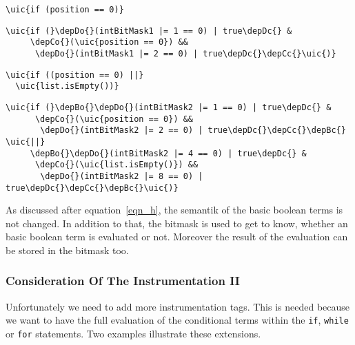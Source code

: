 \documentclass[a4paper,12pt,DIV12]{scrartcl}
\newcommand{\uic}[1]{\textcolor{UnInstrumentedColor}{#1}\xspace}
\newcommand{\depBo}{\textcolor{DepthB}{(}}
\newcommand{\depBc}{\textcolor{DepthB}{)}}
\newcommand{\depCo}{\textcolor{DepthC}{(}}
\newcommand{\depCc}{\textcolor{DepthC}{)}}
\newcommand{\depDo}{\textcolor{DepthD}{(}}
\newcommand{\depDc}{\textcolor{DepthD}{)}}
\begin{document}
\begin{minipage}[t]{0.35\textwidth}
\begin{Verbatim}[commandchars=\\\{\}]
\uic{if (position == 0)}
\end{Verbatim}
\end{minipage}
\begin{minipage}[t]{0.65\textwidth}
\begin{Verbatim}[commandchars=\\\{\}]
\uic{if (}\depDo{}(intBitMask1 |= 1 == 0) | true\depDc{} &
     \depCo{}(\uic{position == 0}) &&
      \depDo{}(intBitMask1 |= 2 == 0) | true\depDc{}\depCc{}\uic{)}
\end{Verbatim}
\end{minipage}
\newline
\newline

\begin{minipage}[t]{0.35\textwidth}
\begin{Verbatim}[commandchars=\\\{\}]
\uic{if ((position == 0) ||}
  \uic{list.isEmpty())}
\end{Verbatim}
\end{minipage}
\begin{minipage}[t]{0.65\textwidth}
\begin{Verbatim}[commandchars=\\\{\}]
\uic{if (}\depBo{}\depDo{}(intBitMask2 |= 1 == 0) | true\depDc{} &
      \depCo{}(\uic{position == 0}) &&
       \depDo{}(intBitMask2 |= 2 == 0) | true\depDc{}\depCc{}\depBc{} \uic{||}
     \depBo{}\depDo{}(intBitMask2 |= 4 == 0) | true\depDc{} &
      \depCo{}(\uic{list.isEmpty()}) &&
       \depDo{}(intBitMask2 |= 8 == 0) | true\depDc{}\depCc{}\depBc{}\uic{)}
\end{Verbatim}
\end{minipage}
\newline
\newline

As discussed after equation~\eqref{eqn_h}, the semantik of the basic boolean terms is not changed. In addition to that, the bitmask is used to get to know, whether an basic boolean term is evaluated or not. Moreover the result of the evaluation can be stored in the bitmask too.

\subsubsection{Consideration Of The Instrumentation II}
Unfortunately we need to add more instrumentation tags. This is needed because we want to have the full evaluation of the conditional terms within the \texttt{if}, \texttt{while} or \texttt{for} statements. Two examples illustrate these extensions.
\end{document}
